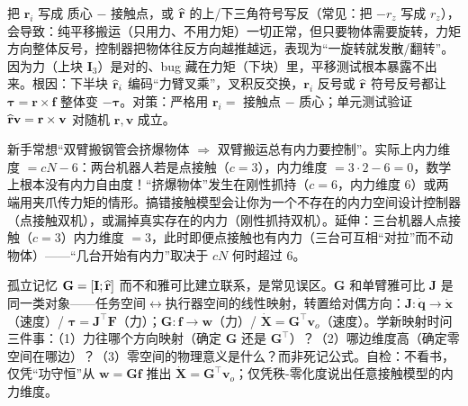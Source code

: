 \begin{pitfall}
把 $\mathbf{r}_i$ 写成 质心 $-$ 接触点，或 $\widehat{\mathbf{r}}$ 的上/下三角符号写反（常见：把 $-r_z$ 写成 $r_z$），会导致：纯平移搬运（只用力、不用力矩）一切正常，但只要物体需要旋转，力矩方向整体反号，控制器把物体往反方向越推越远，表现为“一旋转就发散/翻转”。因为力（上块 $\mathbf{I}_3$）是对的、bug 藏在力矩（下块）里，平移测试根本暴露不出来。根因：下半块 $\widehat{\mathbf{r}}_i$ 编码“力臂叉乘”，叉积反交换，$\mathbf{r}_i$ 反号或 $\widehat{\mathbf{r}}$ 符号反号都让 $\boldsymbol{\tau}=\mathbf{r}\times\mathbf{f}$ 整体变 $-\boldsymbol{\tau}$。对策：严格用 $\mathbf{r}_i=$ 接触点 $-$ 质心；单元测试验证 $\widehat{\mathbf{r}}\mathbf{v}=\mathbf{r}\times\mathbf{v}$ 对随机 $\mathbf{r},\mathbf{v}$ 成立。
\end{pitfall}

\begin{pitfall}
新手常想“双臂搬钢管会挤爆物体 $\Rightarrow$ 双臂搬运总有内力要控制”。实际上内力维度 $=cN-6$：两台机器人若是点接触（$c{=}3$），内力维度 $=3\cdot2-6=0$，数学上根本没有内力自由度！“挤爆物体”发生在刚性抓持（$c{=}6$，内力维度 $6$）或两端用夹爪传力矩的情形。搞错接触模型会让你为一个不存在的内力空间设计控制器（点接触双机），或漏掉真实存在的内力（刚性抓持双机）。延伸：三台机器人点接触（$c{=}3$）内力维度 $=3$，此时即便点接触也有内力（三台可互相“对拉”而不动物体）——“几台开始有内力”取决于 $cN$ 何时超过 $6$。
\end{pitfall}

\begin{pitfall}
孤立记忆 $\mathbf{G}=[\mathbf{I};\widehat{\mathbf{r}}]$ 而不和雅可比建立联系，是常见误区。$\mathbf{G}$ 和单臂雅可比 $\mathbf{J}$ 是同一类对象——任务空间$\leftrightarrow$执行器空间的线性映射，转置给对偶方向：$\mathbf{J}:\dot{\mathbf{q}}\to\dot{\mathbf{x}}$（速度）/ $\boldsymbol{\tau}=\mathbf{J}^\top\mathbf{F}$（力）；$\mathbf{G}:\mathbf{f}\to\mathbf{w}$（力）/ $\dot{\mathbf{X}}=\mathbf{G}^\top\mathbf{v}_o$（速度）。学新映射时问三件事：（1）力往哪个方向映射（确定 $\mathbf{G}$ 还是 $\mathbf{G}^\top$）？（2）哪边维度高（确定零空间在哪边）？（3）零空间的物理意义是什么？而非死记公式。自检：不看书，仅凭“功守恒”从 $\mathbf{w}=\mathbf{G}\mathbf{f}$ 推出 $\dot{\mathbf{X}}=\mathbf{G}^\top\mathbf{v}_o$；仅凭秩-零化度说出任意接触模型的内力维度。
\end{pitfall}

